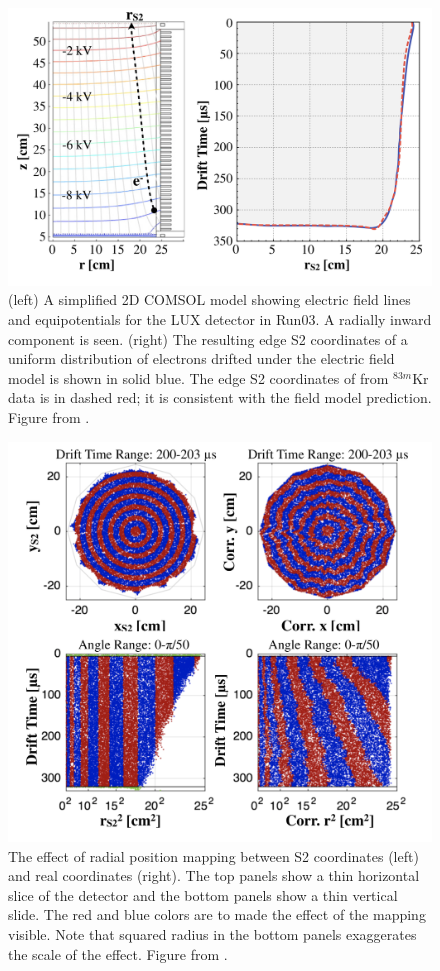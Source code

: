 \begin{figure}[htbp]
\begin{center}
\includegraphics[width=.8\textwidth]{figures/lux/kr_pos1.png}
\caption{ (left) A simplified 2D COMSOL model showing electric field lines and equipotentials for the \acs{LUX} detector in Run03. A radially inward component is seen. (right) The resulting edge S2 coordinates of a uniform distribution of electrons drifted under the electric field model is shown in solid blue. The edge S2 coordinates of from $^{83m}$Kr data is in dashed red; it is consistent with the field model prediction. Figure from \cite{LUXKr}.}
\label{fig:kr_pos1}
\end{center}
\end{figure}

\begin{figure}[htbp]
\begin{center}
\includegraphics[width=.8\textwidth]{figures/lux/kr_pos2.png}
\caption{ The effect of radial position mapping between S2 coordinates (left) and real coordinates (right). The top panels show a thin horizontal slice of the detector and the bottom panels show a thin vertical slide. The red and blue colors are to made the effect of the mapping visible. Note that squared radius in the bottom panels exaggerates the scale of the effect. Figure from \cite{LUXKr}. }
\label{fig:kr_pos2}
\end{center}
\end{figure}

